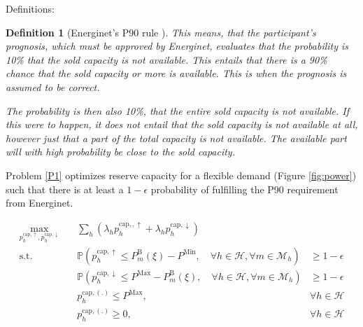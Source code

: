 \documentclass{report}
\newtheorem{definition}{Definition}
\begin{document}
\noindent Definitions:

\begin{definition}[Energinet's P90 rule \cite{energinet}]
    This means, that the participant's prognosis, which must be approved by Energinet, evaluates that the probability is 10\% that the sold capacity is not available. This entails that there is a 90\% chance that the sold capacity or more is available. This is when the prognosis is assumed to be correct.

    The probability is then also 10\%, that the entire sold capacity is not available. If this were to happen, it does not entail that the sold capacity is not available at all, however just that a part of the total capacity is not available. The available part will with high probability be close to the sold capacity.
\end{definition}


\noindent Problem \ref{P1} optimizes reserve capacity for a flexible demand (Figure \ref{fig:power}) such that there is at least a $1-\epsilon$ probability of fulfilling the P90 requirement from Energinet.

\begin{align}\label{P1}
    \max_{p_{h}^{\text{cap}, \uparrow}, p_{h}^{\text{cap}, \downarrow}} \quad & \sum_h \left( \lambda_h p_{h}^{\text{cap}, ,\uparrow} + \lambda_h p_{h}^{\text{cap},\downarrow} \right)                                                                                               \\
    \text{s.t.} \quad                                                         & \mathbb{P}  \left( p_{h}^{\text{cap}, \uparrow} \leq P_{m}^{\text{B}}(\xi) - P^{\text{Min}}, \quad \forall{h} \in \mathcal{H}, \forall{m} \in \mathcal{M}_{h}  \right)   & \geq 1 - \epsilon          \\
                                                                              & \mathbb{P}  \left( p_{h}^{\text{cap}, \downarrow} \leq P^{\text{Max}} - P_{m}^{\text{B}}(\xi), \quad \forall{h} \in \mathcal{H}, \forall{m} \in \mathcal{M}_{h}  \right) & \geq 1 - \epsilon          \\
                                                                              & p_{h}^{\text{cap},(.)} \leq P^{\text{Max}},                                                                                                                              & \forall{h} \in \mathcal{H} \\
                                                                              & p_{h}^{\text{cap},(.)} \geq 0,                                                                                                                                           & \forall{h} \in \mathcal{H}
\end{align}
\end{document}
